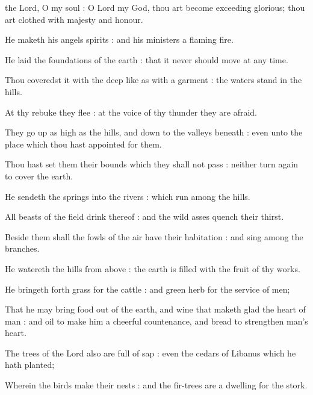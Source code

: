

 the Lord, O my soul : O Lord my God, thou art become exceeding glorious; thou art clothed with majesty and honour.\par
{}
He maketh his angels spirits : and his ministers a flaming fire.\par
{}He laid the foundations of the earth : that it never should move at any time.\par
{}Thou coveredst it with the deep like as with a garment : the waters stand in the hills.\par
{}At thy rebuke they flee : at the voice of thy thunder they are afraid.\par
{}They go up as high as the hills, and down to the valleys beneath : even unto the place which thou hast appointed for them.\par
{}Thou hast set them their bounds which they shall not pass : neither turn again to cover the earth.\par
{}He sendeth the springs into the rivers : which run among the hills.\par
{}All beasts of the field drink thereof : and the wild asses quench their thirst.\par
{}Beside them shall the fowls of the air have their habitation : and sing among the branches.\par
{}He watereth the hills from above : the earth is filled with the fruit of thy works.\par
{}He bringeth forth grass for the cattle : and green herb for the service of men;\par
{}That he may bring food out of the earth, and wine that maketh glad the heart of man : and oil to make him a cheerful countenance, and bread to strengthen man's heart.\par
{}The trees of the Lord also are full of sap : even the cedars of Libanus which he hath planted;\par
{}Wherein the birds make their nests : and the fir-trees are a dwelling for the stork.\par
